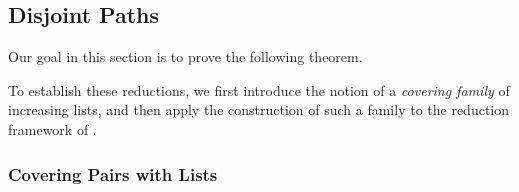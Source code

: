\documentclass[11pt]{article}
\theoremstyle{definition}
\newtheorem{lemma}[theorem]{Lemma}
\begin{document}


    




\subsection{Disjoint Paths}

Our goal in this section is to prove the following theorem.

\lbdp*

To establish these reductions, we first introduce the notion of a \emph{covering family} of increasing lists, and then apply the construction of such a family to the reduction framework of \cite{Slivkins2010}.



\subsubsection*{Covering Pairs with Lists}
\end{document}
